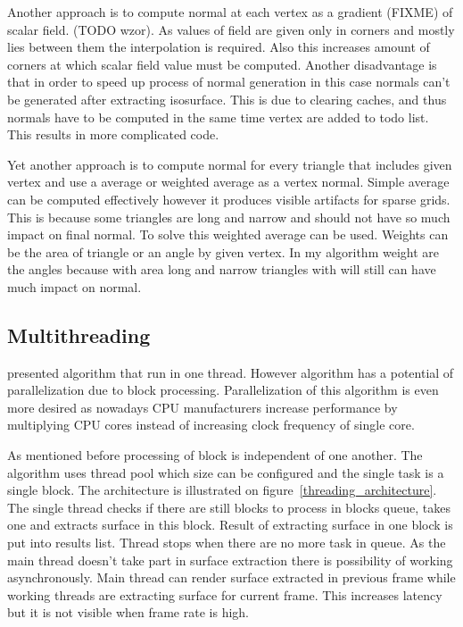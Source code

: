 Another approach is to compute normal at each vertex as a gradient (FIXME) of scalar field. (TODO wzor). As values of field are given only in corners and mostly lies between them the interpolation is required. Also this increases amount of corners at which scalar field value must be computed. Another disadvantage is that in order to speed up process of normal generation in this case normals can't be generated after extracting isosurface. This is due to clearing caches, and thus normals have to be computed in the same time vertex are added to todo list. This results in more complicated code.


Yet another approach is to compute normal for every triangle that includes given vertex and use a average or weighted average as a vertex normal. Simple average can be computed effectively however it produces visible artifacts for sparse grids. This is because some triangles are long and narrow and should not have so much impact on final normal. To solve this weighted average can be used. Weights can be the area of triangle or an angle by given vertex. In my algorithm weight are the angles because with area long and narrow triangles with will still can have much impact on normal. 

\subsection{Multithreading}
\cite{RosenbergBirdwell2008} presented algorithm that run in one thread. However algorithm has a potential of parallelization due to block processing. Parallelization of this algorithm is even more desired as nowadays CPU manufacturers increase performance by multiplying CPU cores instead of increasing clock frequency of single core. 

As mentioned before processing of block is independent of one another. The algorithm uses thread pool which size can be configured and the single task is a single block. The architecture is illustrated on figure~\ref{threading_architecture}. The single thread checks if there are still blocks to process in blocks queue, takes one and extracts surface in this block. Result of extracting surface in one block is put into results list. Thread stops when there are no more task in queue. As the main thread doesn't take part in surface extraction there is possibility of working asynchronously. Main thread can render surface extracted in previous frame while working threads are extracting surface for current frame. This increases latency but it is not visible when frame rate is high. 


